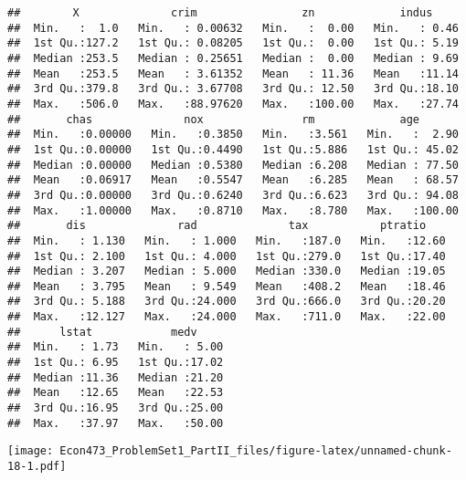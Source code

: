 \documentclass[
]{article}
\newenvironment{Shaded}{\begin{snugshade}}{\end{snugshade}}
\newcommand{\AttributeTok}[1]{\textcolor[rgb]{0.13,0.29,0.53}{#1}}
\newcommand{\FunctionTok}[1]{\textcolor[rgb]{0.13,0.29,0.53}{\textbf{#1}}}
\newcommand{\NormalTok}[1]{#1}
\newcommand{\SpecialCharTok}[1]{\textcolor[rgb]{0.81,0.36,0.00}{\textbf{#1}}}
\newcommand{\StringTok}[1]{\textcolor[rgb]{0.31,0.60,0.02}{#1}}
\begin{document}
\begin{verbatim}
##        X              crim                zn             indus      
##  Min.   :  1.0   Min.   : 0.00632   Min.   :  0.00   Min.   : 0.46  
##  1st Qu.:127.2   1st Qu.: 0.08205   1st Qu.:  0.00   1st Qu.: 5.19  
##  Median :253.5   Median : 0.25651   Median :  0.00   Median : 9.69  
##  Mean   :253.5   Mean   : 3.61352   Mean   : 11.36   Mean   :11.14  
##  3rd Qu.:379.8   3rd Qu.: 3.67708   3rd Qu.: 12.50   3rd Qu.:18.10  
##  Max.   :506.0   Max.   :88.97620   Max.   :100.00   Max.   :27.74  
##       chas              nox               rm             age        
##  Min.   :0.00000   Min.   :0.3850   Min.   :3.561   Min.   :  2.90  
##  1st Qu.:0.00000   1st Qu.:0.4490   1st Qu.:5.886   1st Qu.: 45.02  
##  Median :0.00000   Median :0.5380   Median :6.208   Median : 77.50  
##  Mean   :0.06917   Mean   :0.5547   Mean   :6.285   Mean   : 68.57  
##  3rd Qu.:0.00000   3rd Qu.:0.6240   3rd Qu.:6.623   3rd Qu.: 94.08  
##  Max.   :1.00000   Max.   :0.8710   Max.   :8.780   Max.   :100.00  
##       dis              rad              tax           ptratio     
##  Min.   : 1.130   Min.   : 1.000   Min.   :187.0   Min.   :12.60  
##  1st Qu.: 2.100   1st Qu.: 4.000   1st Qu.:279.0   1st Qu.:17.40  
##  Median : 3.207   Median : 5.000   Median :330.0   Median :19.05  
##  Mean   : 3.795   Mean   : 9.549   Mean   :408.2   Mean   :18.46  
##  3rd Qu.: 5.188   3rd Qu.:24.000   3rd Qu.:666.0   3rd Qu.:20.20  
##  Max.   :12.127   Max.   :24.000   Max.   :711.0   Max.   :22.00  
##      lstat            medv      
##  Min.   : 1.73   Min.   : 5.00  
##  1st Qu.: 6.95   1st Qu.:17.02  
##  Median :11.36   Median :21.20  
##  Mean   :12.65   Mean   :22.53  
##  3rd Qu.:16.95   3rd Qu.:25.00  
##  Max.   :37.97   Max.   :50.00
\end{verbatim}

\begin{Shaded}
\end{Shaded}

\texttt{[image: Econ473\_ProblemSet1\_PartII\_files/figure-latex/unnamed-chunk-18-1.pdf]}

\begin{Shaded}
\end{Shaded}
\end{document}
